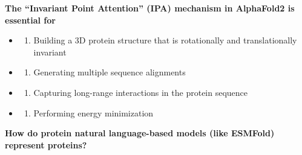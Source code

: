\documentclass[
]{scrbook}
\providecommand{\tightlist}{%
  \setlength{\itemsep}{0pt}\setlength{\parskip}{0pt}}\usepackage{longtable,booktabs,array}
\begin{document}
\textbf{The ``Invariant Point Attention'' (IPA) mechanism in AlphaFold2
is essential for }

\begin{itemize}
\tightlist
\item
  \begin{enumerate}
  \def\labelenumi{(\Alph{enumi})}
  \tightlist
  \item
    Building a 3D protein structure that is rotationally and
    translationally invariant\\
  \end{enumerate}
\item
  \begin{enumerate}
  \def\labelenumi{(\Alph{enumi})}
  \setcounter{enumi}{1}
  \tightlist
  \item
    Generating multiple sequence alignments\\
  \end{enumerate}
\item
  \begin{enumerate}
  \def\labelenumi{(\Alph{enumi})}
  \setcounter{enumi}{2}
  \tightlist
  \item
    Capturing long-range interactions in the protein sequence\\
  \end{enumerate}
\item
  \begin{enumerate}
  \def\labelenumi{(\Alph{enumi})}
  \setcounter{enumi}{3}
  \tightlist
  \item
    Performing energy minimization
  \end{enumerate}
\end{itemize}

\textbf{How do protein natural language-based models (like ESMFold)
represent proteins? }
\end{document}
